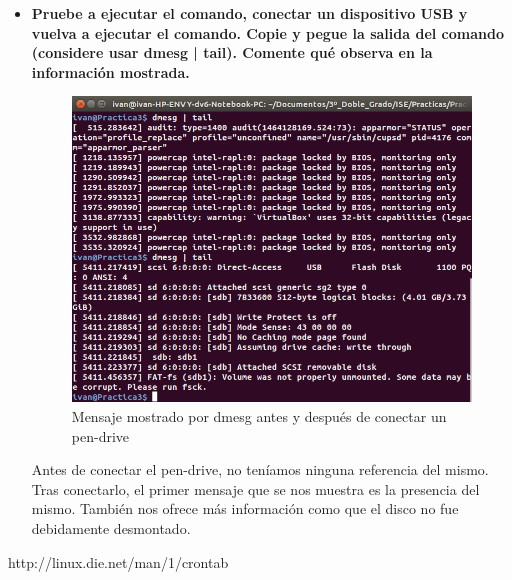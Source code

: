 \begin{itemize}
	\item \textbf{Pruebe a ejecutar el comando, conectar un dispositivo USB y vuelva a
		ejecutar el comando. Copie y pegue la salida del comando (considere usar dmesg |
		tail). Comente qué observa en la información mostrada.}\\
	
	\begin{figure}[H]
	\centering
	\includegraphics[width=0.7\linewidth]{dmesgPenDrive}
	\caption[dmesg]{Mensaje mostrado por dmesg antes y después de conectar un pen-drive}
	\label{fig:dmesgPenDrive}
	\end{figure}
	
	Antes de conectar el pen-drive, no teníamos ninguna referencia del mismo. Tras conectarlo, el primer mensaje que se nos muestra es la presencia del mismo. También nos ofrece más información como que el disco no fue debidamente desmontado.

	
\end{itemize}



\newpage
\begin{thebibliography}{xx}
	 http://linux.die.net/man/1/crontab
	
\end{thebibliography}
